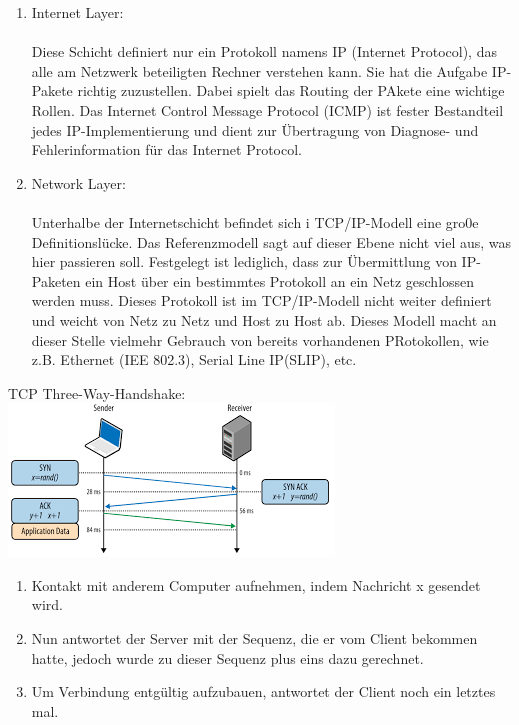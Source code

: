 \documentclass[11pt]{article}
\begin{document}
\begin{enumerate}
        \item Internet Layer:\\\\
        Diese Schicht definiert nur ein Protokoll namens IP (Internet Protocol), das alle am Netzwerk
        beteiligten Rechner verstehen kann. Sie hat die Aufgabe IP-Pakete richtig zuzustellen. Dabei
        spielt das Routing der PAkete eine wichtige Rollen. Das Internet Control Message Protocol (ICMP)
        ist fester Bestandteil jedes IP-Implementierung und dient zur Übertragung von Diagnose- und
        Fehlerinformation für das Internet Protocol.\\

        \item Network Layer:\\\\
        Unterhalbe der Internetschicht befindet sich i TCP/IP-Modell eine gro0e Definitionslücke.
        Das Referenzmodell sagt auf dieser Ebene nicht viel aus, was hier passieren soll. Festgelegt ist
        lediglich, dass zur Übermittlung von IP-Paketen ein Host über ein bestimmtes Protokoll an ein Netz
        geschlossen werden muss. Dieses Protokoll ist im TCP/IP-Modell nicht weiter definiert und weicht
        von Netz zu Netz und Host zu Host ab. Dieses Modell macht an dieser Stelle vielmehr Gebrauch von
        bereits vorhandenen PRotokollen, wie z.B. Ethernet (IEE 802.3), Serial Line IP(SLIP), etc.\\
    \end{enumerate}

    TCP Three-Way-Handshake:
    \includegraphics{images.png}

    \begin{enumerate}


        \item Kontakt mit anderem Computer aufnehmen, indem Nachricht x gesendet wird.\\

        \item Nun antwortet der Server mit der Sequenz, die er vom Client bekommen hatte,
        jedoch wurde zu dieser Sequenz plus eins dazu gerechnet.\\

        \item Um Verbindung entgültig aufzubauen, antwortet der Client noch ein letztes mal.\\

    \end{enumerate}
\end{document}
